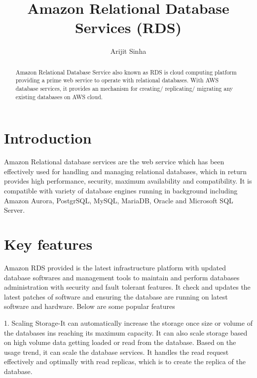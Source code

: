
\title{Amazon Relational Database Services (RDS)}

\author{Arijit Sinha}

\renewcommand{\shortauthors}{A.Sinha}

\begin{abstract}
Amazon Relational Database Service also known as RDS is cloud computing
platform providing a prime web service to operate with relational databases. 
With AWS database services, it provides an mechanism for 
creating/ replicating/ migrating any existing databases on AWS cloud.

\end{abstract}


\maketitle

\section{Introduction}
Amazon Relational database services are the web service which has been 
effectively used for  handling and managing relational databases, which 
in return provides high performance, security, maximum availability and 
compatibility. 
It is compatible with variety of database engines running in background 
including Amazon Aurora, PostgrSQL, MySQL, MariaDB, Oracle and 
Microsoft SQL Server.

\section{Key features}
Amazon RDS provided is the latest infrastructure platform with updated 
database softwares and management tools to maintain and perform databases 
administration with security and fault tolerant features. It check and 
updates the latest patches of software and ensuring the database are 
running on latest software and hardware.
Below are some popular features 

1. Scaling Storage-It can automatically increase the storage once size or 
volume of the databases ins reaching its maximum capacity. It can also 
scale storage based on high volume data getting loaded or read 
from the database. Based on the usage trend, it can scale the database 
services. It handles the read request effectively and optimally with read 
replicas, which is to create the replica of the database. 

